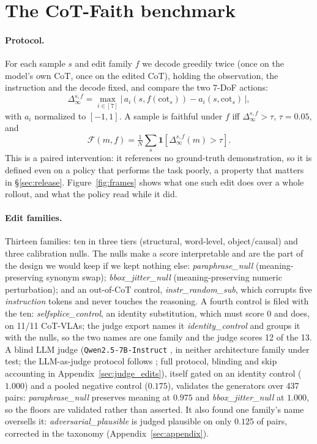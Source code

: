 \documentclass[11pt]{article}
\begin{document}
\section{The CoT-Faith benchmark}
\label{sec:benchmark}


\paragraph{Protocol.} For each sample $s$ and edit family $f$ we decode greedily twice (once on the model's own CoT, once on the edited CoT), holding the observation, the instruction and the decode fixed, and compare the two 7-DoF actions:
\begin{equation}
\Delta_\infty^{s,f} = \max_{i \in [7]}\bigl|\,a_i(s, f(\text{cot}_s)) - a_i(s, \text{cot}_s)\,\bigr|,
\label{eq:delta}
\end{equation}
with $a_i$ normalized to $[-1,1]$. A sample is faithful under $f$ iff $\Delta_\infty^{s,f} > \tau$, $\tau = 0.05$, and
\begin{equation}
\mathcal{F}(m,f) = \tfrac{1}{N}\textstyle\sum_s \mathbf{1}[\Delta_\infty^{s,f}(m) > \tau].
\label{eq:faith}
\end{equation}
This is a paired intervention: it references no ground-truth demonstration, so it is defined even on a policy that performs the task poorly, a property that matters in \S\ref{sec:release}. Figure~\ref{fig:frames} shows what one such edit does over a whole rollout, and what the policy read while it did.

\paragraph{Edit families.} Thirteen families: ten in three tiers (structural, word-level, object/causal) and three calibration nulls. The nulls make a score interpretable and are the part of the design we would keep if we kept nothing else: \emph{paraphrase\_null} (meaning-preserving synonym swap); \emph{bbox\_jitter\_null} (meaning-preserving numeric perturbation); and an out-of-CoT control, \emph{instr\_random\_sub}, which corrupts five \emph{instruction} tokens and never touches the reasoning. A fourth control is filed with the ten: \emph{selfsplice\_control}, an identity substitution, which must score $0$ and does, on 11/11 CoT-VLAs; the judge export names it \emph{identity\_control} and groups it with the nulls, so the two names are one family and the judge scores 12 of the 13. A blind LLM judge (\texttt{Qwen2.5-7B-Instruct} \citep{qwen25}, in neither architecture family under test; the LLM-as-judge protocol follows \citet{mtbench}; full protocol, blinding and skip accounting in Appendix~\ref{sec:judge_edits}), itself gated on an identity control ($1.000$) and a pooled negative control ($0.175$), validates the generators over 437 pairs: \emph{paraphrase\_null} preserves meaning at $0.975$ and \emph{bbox\_jitter\_null} at $1.000$, so the floors are validated rather than asserted. It also found one family's name oversells it: \emph{adversarial\_plausible} is judged plausible on only $0.125$ of pairs, corrected in the taxonomy (Appendix~\ref{sec:appendix}).
\end{document}
